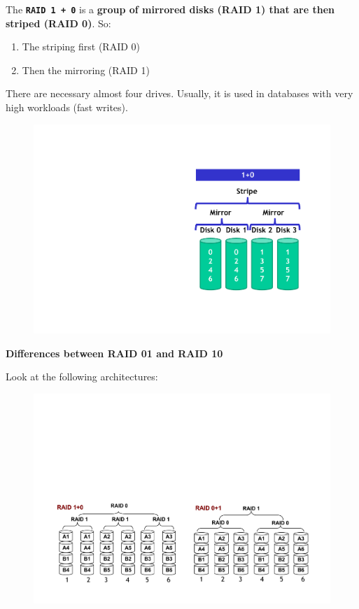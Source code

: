 \label{RAID 1 + 0}\highspace
The \hypertarget{RAID 1 + 0}{\texttt{\textbf{RAID 1 + 0}}} is a \textbf{group of mirrored disks (RAID 1) that are then striped (RAID 0)}. So: 
\begin{enumerate}
    \item The striping first (RAID 0)
    \item Then the mirroring (RAID 1)
\end{enumerate}
There are necessary almost four drives. Usually, it is used in databases with very high workloads (fast writes).
\newpage
\begin{figure}[!htp]
    \centering
    \includegraphics[width=.5\textwidth]{img/raid-4.pdf}
\end{figure}

\highspace
\begin{flushleft}
    \textcolor{Green3}{ \textbf{Differences between RAID 01 and RAID 10}}
\end{flushleft}
Look at the following architectures:
\begin{figure}[!htp]
    \centering
    \includegraphics[width=\textwidth]{img/raid-5.pdf}
\end{figure}

